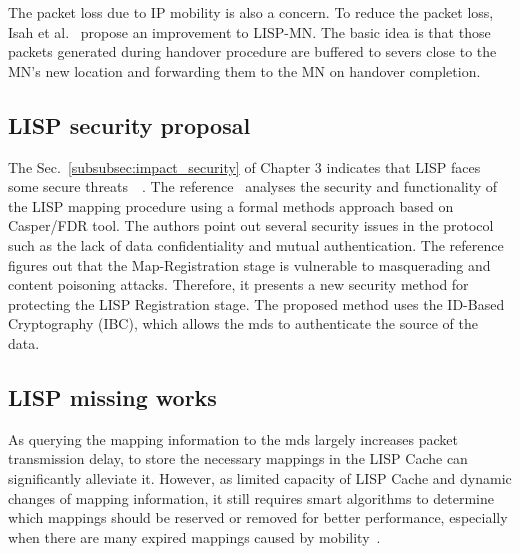 The packet loss due to IP mobility is also a concern. To reduce the packet loss, Isah et al.~\cite{isah2017towards} propose an improvement to LISP-MN. The basic idea is that those packets generated during handover procedure are buffered to severs close to the MN’s new location and forwarding them to the MN on handover completion.





\subsection{LISP security proposal}
\label{subsec:lisp_sec_proposal}
The Sec.~\ref{subsubsec:impact_security} of Chapter 3 indicates that LISP faces some secure threats~\cite{raheem2013supporting}~\cite{montero2013securing}. The reference~\cite{aiash2013novel} analyses the security and functionality of the LISP mapping procedure using a formal methods approach based on Casper/FDR tool. The authors point out several security issues in the protocol such as the lack of data confidentiality and mutual authentication. The reference~\cite{aiash2013securing} figures out that the Map-Registration stage is vulnerable to masquerading and content poisoning attacks. Therefore, it presents a new security method for protecting the LISP Registration stage. The proposed method uses the ID-Based Cryptography (IBC), which allows the \acrshort{mds} to authenticate the source of the data. 


\subsection{LISP missing works}
\label{subsec:studies_status}

As querying the mapping information to the \acrshort{mds} largely increases packet transmission delay, to store the necessary mappings in the LISP Cache can significantly alleviate it. However, as limited capacity of LISP Cache and dynamic changes of mapping information, it still requires smart algorithms to determine which mappings should be reserved or removed for better performance, especially when there are many expired mappings caused by mobility~\cite{feng2017locator}.

